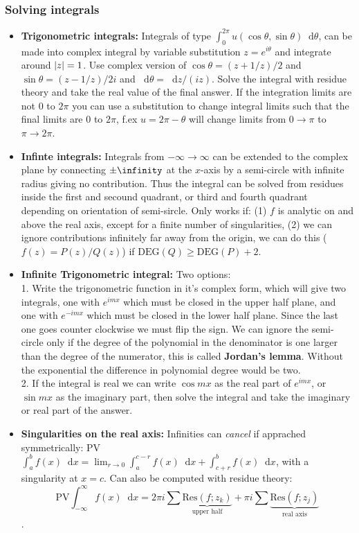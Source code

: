 \documentclass[a4paper, 10pt]{article}
\newcommand*\diff{\mathop{}\!\mathrm{d}}
\begin{document}
\begin{multicols*}{3}
\subsubsection*{Solving integrals}
\begin{itemize}
\item \textbf{Trigonometric integrals:} Integrals of type $\int_0^{2\pi} u(\cos{\theta}, \sin{\theta}) \diff \theta$, can be made into complex integral by variable substitution $z=e^{i\theta}$ and integrate around $\abs{z}=1$. Use complex version of $\cos{\theta} = (z+1/z)/2$ and $\sin{\theta}=(z-1/z)/2i$ and $\diff \theta = \diff z/(iz)$. Solve the integral with residue theory and take the real value of the final answer.
If the integration limits are not $0$ to $2\pi$ you can use a substitution to change integral limits such that the final limits are $0$ to $2\pi$, f.ex $u=2\pi-\theta$ will change limits from $0\rightarrow\pi$ to $\pi\rightarrow 2\pi$.
\item \textbf{Infinte integrals:} Integrals from $-\infty\rightarrow\infty$ can be extended to the complex plane by connecting $\pm\infinity$ at the $x$-axis by a semi-circle with infinite radius giving no contribution. Thus the integral can be solved from residues inside the first and secound quadrant, or third and fourth quadrant depending on orientation of semi-sircle. Only works if: (1) $f$ is analytic on and above the real axis, except for a finite number of singularities, (2) we can ignore contributions infinitely far away from the origin, we can do this ($f(z)=P(z)/Q(z)$) if $\text{DEG}(Q) \geq \text{DEG}(P)+2$.
\item \textbf{Infinite Trigonometric integral:} Two options:\\1. Write the trigonometric function in it's complex form, which will give two integrals, one with $e^{imx}$ which must be closed in the upper half plane, and one with $e^{-imx}$ which must be closed in the lower half plane. Since the last one goes counter clockwise we must flip the sign. We can ignore the semi-circle only if the degree of the polynomial in the denominator is one larger than the degree of the numerator, this is called \textbf{Jordan's lemma}. Without the exponential the difference in polynomial degree would be two. \\2. If the integral is real we can write $\cos{mx}$ as the real part of $e^{imx}$, or $\sin{mx}$ as the imaginary part, then solve the integral and take the imaginary or real part of the answer.
\item \textbf{Singularities on the real axis:} Infinities can \textit{cancel} if apprached symmetrically: PV$\int_a^b f(x)\diff x = \lim_{r\rightarrow 0} \int_a^{c-r} f(x)\diff x + \int_{c+r}^{b}f(x)\diff x$, with a singularity at $x=c$. Can also be computed with residue theory:
$$\text{PV}\int_{-\infty}^{\infty} f(x)\diff x = 2\pi i \sum \underbrace{\text{Res}(f; z_k)}_{\text{upper half}} + \pi i \sum \underbrace{\text{Res}(f;z_j)}_{\text{real axis}}$$.
\end{itemize}
\newpage
\begin{mdframed}

\end{mdframed}
\end{multicols*}
\end{document}
